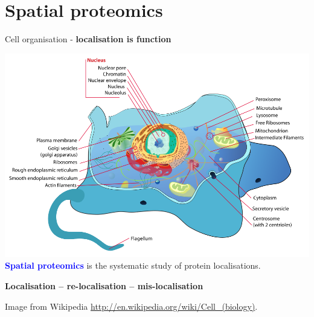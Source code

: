 \documentclass{beamer}
\theoremstyle{example}
\begin{document}




\section{Spatial proteomics}


\begin{frame}{Cell organisation - \textbf{localisation is function}}
  \begin{center}
    \includegraphics[width=.8\linewidth]{figs/Animal_cell_structure.png} \\
    \textbf{\textcolor{Blue}{Spatial proteomics}} is the systematic
    study of protein localisations.
  \end{center}

  \begin{center}
    \textbf{Localisation -- re-localisation -- mis-localisation}
  \end{center}

  \tiny Image from Wikipedia
  \url{http://en.wikipedia.org/wiki/Cell_(biology)}.
\end{frame}
\end{document}
